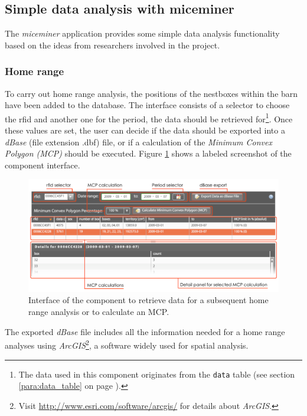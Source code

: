 \subsection{Simple data analysis with miceminer}
\label{subsec:data_ana} 

The \textit{miceminer} application provides some simple data analysis functionality based on the ideas from researchers involved in the project.

\subsubsection{Home range}
\label{subsubsec:homerangedata}

To carry out home range analysis, the positions of the nestboxes within the barn have been added to the database. The interface consists of a selector to choose the rfid and another one for the period, the data should be retrieved for\footnote{The data used in this component originates from the \lstinline|data| table (see section \ref{para:data_table} on page \pageref{para:data_table}).}. Once these values are set, the user can decide if the data should be exported into a \textit{dBase} (file extension .dbf) file, or if a calculation of the \textit{Minimum Convex Polygon (MCP)} should be executed. Figure \ref{fig:home_range} shows a labeled screenshot of the component interface.

\begin{figure}[htpb]
\begin{center}
  \includegraphics[width=.75\textwidth]{assets/pdf/home_range.pdf}
  \caption[\textit{Home range} component interface overview]{Interface of the component to retrieve data for a subsequent home range analysis or to calculate an MCP.}
  \label{fig:home_range}
\end{center}
\end{figure}

The exported \textit{dBase} file includes all the information needed for a home range analyses using \textit{ArcGIS}\footnote{Visit \href{http://www.esri.com/software/arcgis/}{http://www.esri.com/software/arcgis/} for details about \textit{ArcGIS}.}, a software widely used for spatial analysis. 


